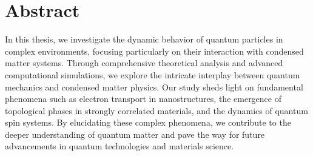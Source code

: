     \setlength{\topmargin}{19pt} %
    \setlength{\footskip}{19pt} %
\chapter*{Abstract}
In this thesis, we investigate the dynamic behavior of quantum particles in complex environments, focusing particularly on their interaction with condensed matter systems. Through comprehensive theoretical analysis and advanced computational simulations, we explore the intricate interplay between quantum mechanics and condensed matter physics. Our study sheds light on fundamental phenomena such as electron transport in nanostructures, the emergence of topological phases in strongly correlated materials, and the dynamics of quantum spin systems. By elucidating these complex phenomena, we contribute to the deeper understanding of quantum matter and pave the way for future advancements in quantum technologies and materials science.